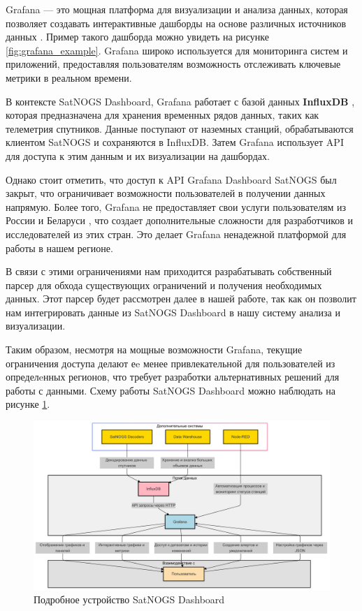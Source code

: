 \documentclass[14pt, a4paper]{bsu}
\begin{document}
Grafana — это мощная платформа для визуализации и анализа данных, которая
позволяет создавать интерактивные дашборды на основе различных источников
данных \cite{grafana_docs}. Пример такого дашборда можно увидеть на рисунке
\ref{fig:grafana_example}. Grafana широко используется для мониторинга систем
и приложений, предоставляя пользователям возможность отслеживать ключевые
метрики в реальном времени.

В контексте SatNOGS Dashboard, Grafana работает с базой данных
\textbf{InfluxDB} \cite{influxdb_docs}, которая предназначена для хранения
временных рядов данных, таких как телеметрия спутников. Данные поступают от
наземных станций, обрабатываются клиентом SatNOGS и сохраняются в InfluxDB.
Затем Grafana использует API для доступа к этим данным и их визуализации на
дашбордах.

Однако стоит отметить, что доступ к API Grafana Dashboard SatNOGS был закрыт,
что ограничивает возможности пользователей в получении данных напрямую. Более
того, Grafana не предоставляет свои услуги пользователям из России и Беларуси
\cite{grafana_community_post}, что создает дополнительные сложности для
разработчиков и исследователей из этих стран. Это делает Grafana ненадежной
платформой для работы в нашем регионе.

В связи с этими ограничениями нам приходится разрабатывать собственный парсер
для обхода существующих ограничений и получения необходимых данных. Этот
парсер будет рассмотрен далее в нашей работе, так как он позволит нам
интегрировать данные из SatNOGS Dashboard в нашу систему анализа и
визуализации.

Таким образом, несмотря на мощные возможности Grafana, текущие ограничения
доступа делают еe менее привлекательной для пользователей из определeнных
регионов, что требует разработки альтернативных решений для работы с данными.
Схему работы SatNOGS Dashboard можно наблюдать на рисунке
\ref{fig:grafana_infra}.

\begin{figure}[htbp] \centering
	\includegraphics[width=1.0\textwidth]{grafana_infra} \caption{Подробное
		устройство SatNOGS Dashboard} \label{fig:grafana_infra} \end{figure}
\end{document}
